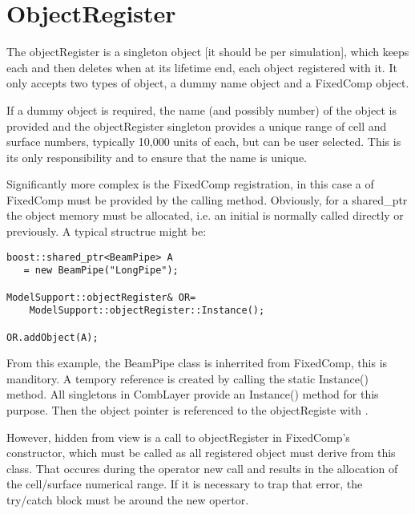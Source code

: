 \section{ObjectRegister}
\label{ObjectRegister}

The objectRegister is a singleton object [it should be per
  simulation], which keeps each and then deletes when at its lifetime
end, each object registered with it. It only accepts two types of
object, a dummy name object and a FixedComp object. 

If a dummy object is required, the name (and possibly number) of the object 
is provided and the objectRegister singleton provides a unique
range of cell and surface numbers, typically 10,000 units of each, but
can be user selected. This is its only responsibility and to ensure that the
name is unique. 

Significantly more complex is the FixedComp registration, in this case
a  of FixedComp must be provided by the
calling method. Obviously, for a shared\_ptr the object memory must be
allocated, i.e. an initial  is normally called
directly or previously. A typical structrue might be:

\begin{verbatim}
boost::shared_ptr<BeamPipe> A 
   = new BeamPipe("LongPipe");

ModelSupport::objectRegister& OR=
    ModelSupport::objectRegister::Instance();

OR.addObject(A);
\end{verbatim}

From this example, the BeamPipe class is inherrited from FixedComp,
this is manditory. A tempory reference  is created by calling
the static Instance() method. All singletons in CombLayer provide an
Instance() method for this purpose. Then the object pointer is referenced
to the objectRegiste with .

However, hidden from view is a call to objectRegister in FixedComp's
constructor, which must be called as all registered object must derive
from this class. That occures during the operator new call and results
in the allocation of the cell/surface numerical range. If it is
necessary to trap that error, the try/catch block must be around the
new opertor.



